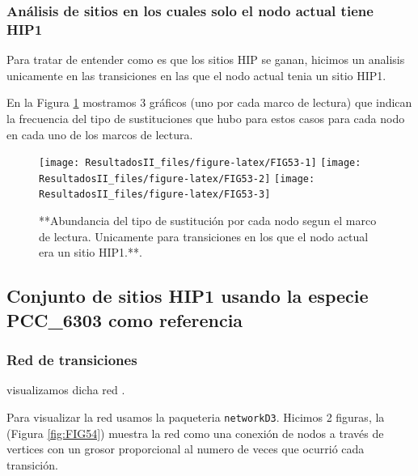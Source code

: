\documentclass[
]{book}
\begin{document}
\hypertarget{anuxe1lisis-de-sitios-en-los-cuales-solo-el-nodo-actual-tiene-hip1-1}{%
\subsubsection{Análisis de sitios en los cuales solo el nodo actual tiene HIP1}\label{anuxe1lisis-de-sitios-en-los-cuales-solo-el-nodo-actual-tiene-hip1-1}}

Para tratar de entender como es que los sitios HIP se ganan, hicimos un analisis unicamente en las transiciones en las que el nodo actual tenia un sitio HIP1.

En la Figura \ref{fig:FIG53} mostramos 3 gráficos (uno por cada marco de lectura) que indican la frecuencia del tipo de sustituciones que hubo para estos casos para cada nodo en cada uno de los marcos de lectura.

\begin{figure}

{\centering \texttt{[image: ResultadosII\_files/figure-latex/FIG53-1]} \texttt{[image: ResultadosII\_files/figure-latex/FIG53-2]} \texttt{[image: ResultadosII\_files/figure-latex/FIG53-3]} 

}

\caption{**Abundancia del tipo de sustitución por cada nodo segun el marco de lectura. Unicamente para transiciones en los que el nodo actual era un sitio HIP1.**.}\label{fig:FIG53}
\end{figure}

\hypertarget{conjunto-de-sitios-hip1-usando-la-especie-pcc_6303-como-referencia}{%
\subsection{Conjunto de sitios HIP1 usando la especie PCC\_6303 como referencia}\label{conjunto-de-sitios-hip1-usando-la-especie-pcc_6303-como-referencia}}

\hypertarget{red-de-transiciones-2}{%
\subsubsection{Red de transiciones}\label{red-de-transiciones-2}}

visualizamos dicha red .

Para visualizar la red usamos la paqueteria \texttt{networkD3}. Hicimos 2 figuras, la (Figura \ref{fig:FIG54}) muestra la red como una conexión de nodos a través de vertices con un grosor proporcional al numero de veces que ocurrió cada transición.
\end{document}
